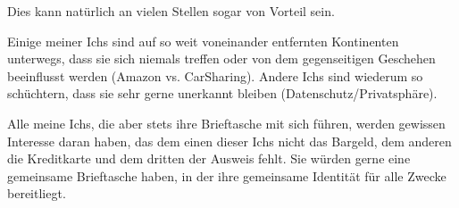Dies kann natürlich an vielen Stellen sogar von Vorteil sein.

Einige meiner Ichs sind auf so weit voneinander entfernten Kontinenten unterwegs, dass sie sich niemals treffen oder von dem gegenseitigen Geschehen beeinflusst werden (Amazon vs. CarSharing). Andere Ichs sind wiederum so schüchtern, dass sie sehr gerne unerkannt bleiben (Datenschutz/Privatsphäre). 

Alle meine Ichs, die aber stets ihre Brieftasche mit sich führen, werden gewissen Interesse daran haben, das dem einen dieser Ichs nicht das Bargeld, dem anderen die Kreditkarte und dem dritten der Ausweis fehlt. Sie würden gerne eine gemeinsame Brieftasche haben, in der ihre gemeinsame Identität für alle Zwecke bereitliegt.

\vspace{0.3cm}

\vspace{0.5cm}
